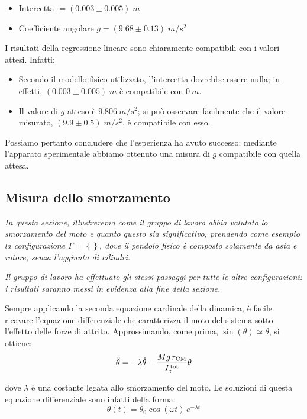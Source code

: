 \documentclass{article}
\begin{document}
\begin{itemize}
  \item Intercetta $= (0.003 \pm 0.005)\;\unit{m}$
  \item Coefficiente angolare $g = (9.68 \pm 0.13)\;\unit{m\per s^2}$
\end{itemize}
\pagebreak
I risultati della regressione lineare sono chiaramente compatibili
con i valori attesi. Infatti:
\begin{itemize}
  \item Secondo il modello fisico utilizzato, l'intercetta dovrebbe
  essere nulla; in effetti, $(0.003\pm0.005)\;\unit{m}$ è compatibile
  con $\qty{0}{m}$.
  \item Il valore di $g$ atteso è $\qty{9.806}{m\per s^2}$; si può
  osservare facilmente che il valore misurato,
  $(9.9\pm0.5)\;\unit{m \per s^2}$, è compatibile con esso.
\end{itemize}

Possiamo pertanto concludere che l'esperienza ha avuto successo:
mediante l'apparato sperimentale abbiamo ottenuto una misura di $g$
compatibile con quella attesa.

\pagebreak
\subsection{Misura dello smorzamento}

\emph{
  In questa sezione, illustreremo come il gruppo di lavoro abbia
  valutato lo smorzamento del moto e quanto questo sia significativo,
  prendendo come esempio la configurazione $\Gamma=\left\{\right\}$,
  dove il pendolo fisico è composto solamente da asta e rotore, senza
  l'aggiunta di cilindri.
}

\emph{
  Il gruppo di lavoro ha effettuato gli stessi passaggi per tutte le
  altre configurazioni: i risultati saranno messi in evidenza alla
  fine della sezione.
}
\vspace{2mm}

Sempre applicando la seconda equazione cardinale della dinamica,
è facile ricavare l'equazione differenziale che caratterizza il moto
del sistema sotto l'effetto delle forze di attrito.
Approssimando, come prima, $\sin(\theta)\simeq\theta$, si ottiene:
\[ \ddot{\theta} = -\lambda\dot{\theta} -\frac{Mg\,r_\text{CM}}{I_z^\text{\,tot}} \theta \]

dove $\lambda$ è una costante legata allo smorzamento del moto.
Le soluzioni di questa equazione differenziale sono infatti della forma:
\[\theta(t) = \theta_0\cos(\omega t)\,e^{-\lambda t}\]
\end{document}
